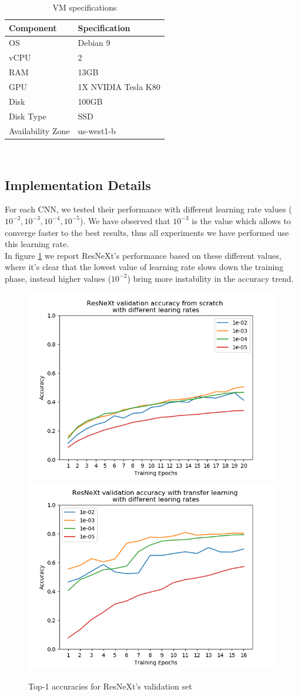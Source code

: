 \documentclass{article}
\begin{document}
\begin{table}
	\centering
	\begin{tabular}{|l|l|} 
		\hline
		\textbf{Component} & \textbf{Specification}  \\ 
		\hline
		OS                 & Debian 9                \\
		vCPU               & 2                       \\
		RAM                & 13GB                    \\
		GPU                & 1X NVIDIA Tesla K80     \\
		Disk               & 100GB                   \\
		Disk Type          & SSD                     \\
		Availability Zone  & us-west1-b              \\
		\hline
	\end{tabular}
\\
\caption{VM specifications}
   	\label{table:specVM}
\end{table}

\subsection{Implementation Details}\label{ImplDet}

For each CNN, we tested their performance with different learning rate values ($10^{-2}, 10^{-3}, 10^{-4}, 10^{-5}$). We have observed that $10^{-3}$ is the value which allows to converge faster to the best results, thus all experiments we have performed use this learning rate.\\
In figure \ref{fig:lr} we report ResNeXt's performance based on these different values, where it's clear that the lowest value of learning rate slows down the training phase, instead higher values ($10^{-2}$) bring more instability in the accuracy trend.

\begin{figure}[h]
	\centering
	\includegraphics[width=.5\textwidth]{graphs/lr_scratch}\hfill
	\includegraphics[width=.5\textwidth]{graphs/lr_tl}
	\caption{Top-1 accuracies for ResNeXt's validation set}
	\label{fig:lr}
\end{figure}
\end{document}
